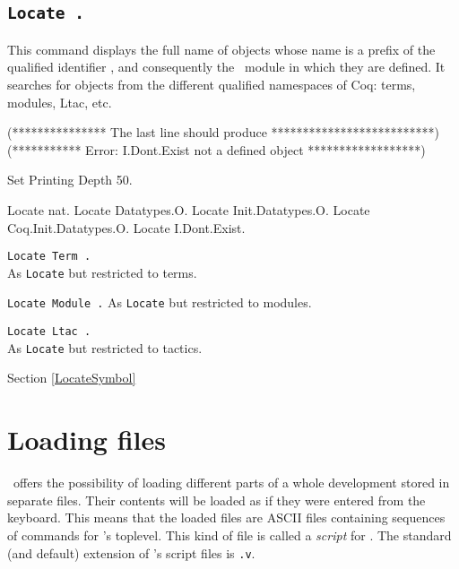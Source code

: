 
\subsection[\tt Locate {\qualid}.]{\tt Locate {\qualid}.
\label{Locate}}
This command displays the full name of objects whose name is a prefix of the
qualified identifier {\qualid}, and consequently the \Coq\ module in which they
are defined. It searches for objects from the different qualified namespaces of
Coq: terms, modules, Ltac, etc.

\begin{coq_eval}
(*************** The last line should produce **************************)
(*********** Error: I.Dont.Exist not a defined object ******************)
\end{coq_eval}
\begin{coq_eval}
Set Printing Depth 50.
\end{coq_eval}
\begin{coq_example}
Locate nat.
Locate Datatypes.O.
Locate Init.Datatypes.O.
Locate Coq.Init.Datatypes.O.
Locate I.Dont.Exist.
\end{coq_example}

\begin{Variants}
\item {\tt Locate Term {\qualid}.}\\
  As {\tt Locate} but restricted to terms.

\item {\tt Locate Module {\qualid}.}
  As {\tt Locate} but restricted to modules.

\item {\tt Locate Ltac {\qualid}.}\\
  As {\tt Locate} but restricted to tactics.
\end{Variants}


\SeeAlso Section \ref{LocateSymbol}

\section{Loading files}

\Coq\ offers the possibility of loading different
parts of a whole development stored in separate files. Their contents
will be loaded as if they were entered from the keyboard. This means
that the loaded files are ASCII files containing sequences of commands
for \Coq's toplevel. This kind of file is called a {\em script} for
\Coq{}. The standard (and default) extension of
\Coq's script files is {\tt .v}.


